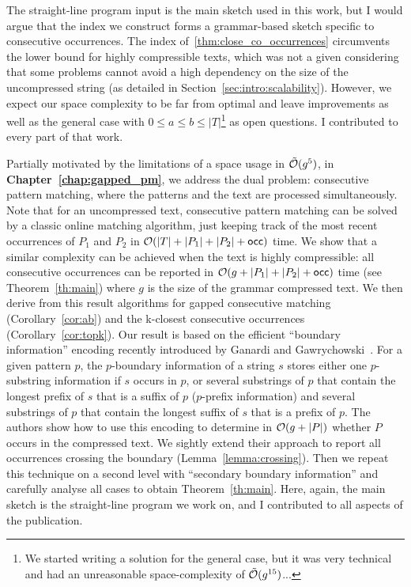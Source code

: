 The straight-line program input is the main sketch used in this work, but I would argue that the index we construct forms a grammar-based sketch specific to consecutive occurrences.
The index of~\ref{thm:close_co_occurrences} circumvents the lower bound for highly compressible texts, which was not a given considering that some problems cannot avoid a high dependency on the size of the uncompressed string (as detailed in Section~\ref{sec:intro:scalability}). However, we expect our space complexity to be far from optimal and leave improvements as well as the general case with $0 \leq a \leq b \leq |T|$\footnote{We started writing a solution for the general case, but it was very technical and had an unreasonable space-complexity of $\tilde {\mathcal{O}}(g^{15})$...} as open questions. I contributed to every part of that work.

Partially motivated by the limitations of a space usage in $\tilde {\mathcal{O}}(g^5)$, in \textbf{Chapter~\ref{chap:gapped_pm}}, we address the dual problem: consecutive pattern matching, where the patterns and the text are processed simultaneously. Note that for an uncompressed text, consecutive pattern matching can be solved by a classic online matching algorithm, just keeping track of the most recent occurrences of $P_1$ and $P_2$ in $\mathcal{O}(|T|+|P_1|+|P_2|+\mathsf{occ})$ time.
We show that a similar complexity can be achieved when the text is highly compressible: all consecutive occurrences can be reported in $\mathcal{O}(g+|P_1|+|P_2|+\mathsf{occ})$ time (see Theorem~\ref{th:main}) where $g$ is the size of the grammar compressed text. We then derive from this result algorithms for gapped consecutive matching (Corollary~\ref{cor:ab}) and the k-closest consecutive occurrences (Corollary~\ref{cor:topk}).
Our result is based on the efficient ``boundary information'' encoding recently introduced by Ganardi and Gawrychowski~\cite{DBLP:conf/soda/GanardiG22}. For a given pattern $p$, the $p$-boundary information of a string $s$ stores either one $p$-substring information if $s$ occurs in $p$, or several substrings of $p$ that contain the longest prefix of $s$ that is a suffix of $p$ ($p$-prefix information) and several substrings of $p$ that contain the longest suffix of $s$ that is a prefix of $p$. The authors show how to use this encoding to determine in $\mathcal{O}(g+|P|)$ whether $P$ occurs in the compressed text. We sightly extend their approach to report all occurrences crossing the boundary (Lemma~\ref{lemma:crossing}). Then we repeat this technique on a second level with ``secondary boundary information'' and carefully analyse all cases to obtain Theorem~\ref{th:main}. Here, again, the main sketch is the straight-line program we work on, and I contributed to all aspects of the publication.

